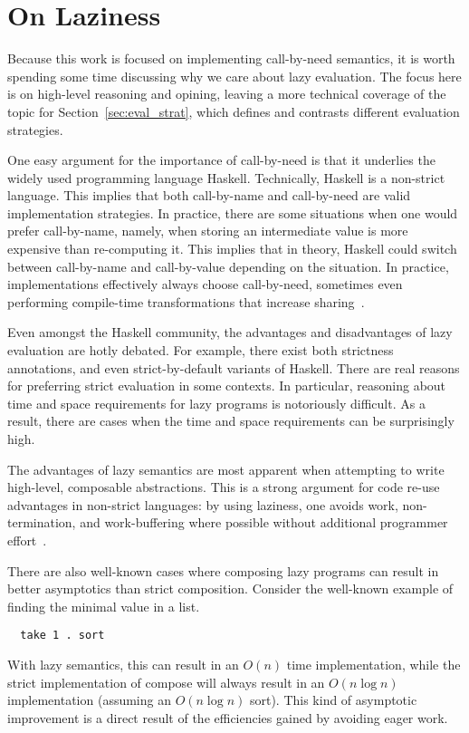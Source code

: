 \section{On Laziness}

Because this work is focused on implementing call-by-need semantics, it is worth
spending some time discussing why we care about lazy evaluation. The focus here
is on high-level reasoning and opining, leaving a more technical coverage
of the topic for Section~\ref{sec:eval_strat}, which defines and contrasts
different evaluation strategies.

One easy argument for the importance of call-by-need is that it underlies the
widely used programming language Haskell. Technically, Haskell is a non-strict
language.  This implies that both call-by-name and call-by-need are valid
implementation strategies. In practice, there are some situations when one would
prefer call-by-name, namely, when storing an intermediate value is more
expensive than re-computing it. This implies that in theory, Haskell could
switch between call-by-name and call-by-value depending on the situation.  In
practice, implementations effectively always choose call-by-need, sometimes
even performing compile-time transformations that increase sharing~\cite{jones96floating}.  

Even amongst the Haskell community, the advantages and disadvantages of
lazy evaluation are hotly debated. For example, there exist both strictness
annotations, and even strict-by-default variants of Haskell. There are real
reasons for preferring strict evaluation in some contexts. In particular,
reasoning about time and space requirements for lazy programs is notoriously
difficult. As a result, there are cases when the time and space requirements can
be surprisingly high.

The advantages of lazy semantics are most apparent when attempting to write
high-level, composable abstractions. This is a strong argument for code re-use
advantages in non-strict languages: by using laziness, one avoids work,
non-termination, and work-buffering where possible without additional programmer
effort~\cite{hughes1989functional}.

There are also well-known cases where composing lazy programs can result in
better asymptotics than strict composition. Consider the well-known example of
finding the minimal value in a list. 
\begin{verbatim}
  take 1 . sort
\end{verbatim}
With lazy semantics, this can result in an $O(n)$ time implementation, while the
strict implementation of compose will always result in an $O(n \log n)$
implementation (assuming an $O(n \log n)$ sort). This kind of asymptotic
improvement is a direct result of the efficiencies gained by avoiding eager
work. 

